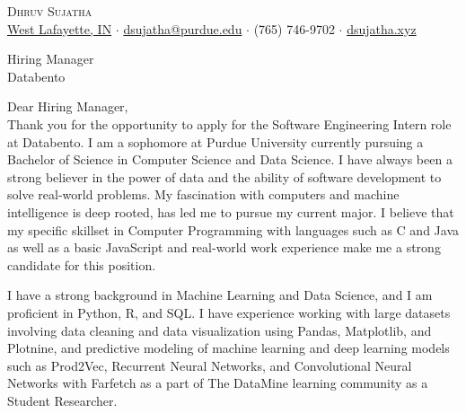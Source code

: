 \documentclass[a4paper]{article}
\begin{document}
\vspace*{-40pt}

    

\vspace*{-10pt}
\begin{center}
	{\Huge \scshape {Dhruv Sujatha}}\\
	\href{https://www.google.com/maps/place/West+Lafayette,+IN/}{West Lafayette, IN} $\cdot$ \href{mailto:dsujatha@purdue.edu}{dsujatha@purdue.edu} $\cdot$ (765) 746-9702 $\cdot$ \href{https://dsujatha.xyz}{dsujatha.xyz}\\
\end{center}

\hrulefill
\fontsize{14pt}{17pt}\selectfont

\vspace*{30pt}
Hiring Manager\\
Databento\\

\vspace*{30pt}

Dear Hiring Manager,\\
\vspace*{20pt}
Thank you for the opportunity to apply for the Software Engineering Intern role at Databento. 
I am a sophomore at Purdue University currently pursuing a Bachelor of Science in Computer Science and Data Science.
I have always been a strong believer in the power of data and the ability of software development to solve real-world problems. 
My fascination with computers and machine intelligence is deep rooted, has led me to pursue my current major. 
I believe that my specific skillset in Computer Programming with languages such as C and Java as well as a basic JavaScript and real-world work experience make me a strong candidate for this position.

\vspace*{20pt}

I have a strong background in Machine Learning and Data Science, 
and I am proficient in Python, R, and SQL. I have experience working with large datasets
involving data cleaning and data visualization using Pandas, Matplotlib, and Plotnine, and predictive modeling of machine learning 
and deep learning models such as Prod2Vec, Recurrent Neural Networks, and Convolutional Neural Networks with Farfetch as a part of The DataMine learning community as a Student Researcher. \\

\vspace*{20pt}
\end{document}
